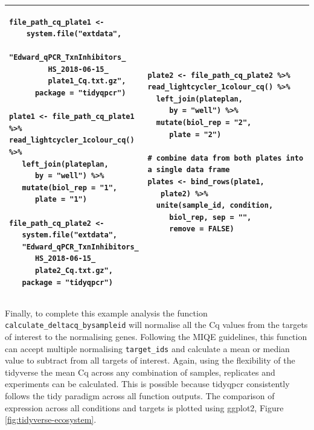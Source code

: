 \documentclass{SBCbookchapter}
\begin{document}
\begin{center}
\begin{tabular}{|p{5.6cm}  p{5.6cm}|}
\hline
 \begin{lstlisting}[firstnumber=40]
 file_path_cq_plate1 <- 
    system.file("extdata",
      "Edward_qPCR_TxnInhibitors_
         HS_2018-06-15_
         plate1_Cq.txt.gz",
      package = "tidyqpcr")

plate1 <- file_path_cq_plate1 %>%
read_lightcycler_1colour_cq() %>%
   left_join(plateplan,
      by = "well") %>%
   mutate(biol_rep = "1",
      plate = "1")

file_path_cq_plate2 <-
   system.file("extdata",
   "Edward_qPCR_TxnInhibitors_
      HS_2018-06-15_
      plate2_Cq.txt.gz",
   package = "tidyqpcr")
\end{lstlisting} &
\begin{lstlisting}[firstnumber=60]
plate2 <- file_path_cq_plate2 %>%
read_lightcycler_1colour_cq() %>%
  left_join(plateplan,
     by = "well") %>%
  mutate(biol_rep = "2",
     plate = "2")

# combine data from both plates into a single data frame
plates <- bind_rows(plate1,
   plate2) %>%
  unite(sample_id, condition,
     biol_rep, sep = "",
     remove = FALSE)
\end{lstlisting} \\
\hline
\end{tabular}
\end{center}

Finally, to complete this example analysis the function \lstinline{calculate_deltacq_bysampleid} will normalise all the Cq values from the targets of interest to the normalising genes. Following the MIQE guidelines,  this function can accept multiple normalising \lstinline{target_ids} and calculate a mean or median value to subtract from all targets of interest. Again, using the flexibility of the tidyverse the mean Cq across any combination of samples, replicates and experiments can be calculated. This is possible because tidyqpcr consistently follows the tidy paradigm across all function outputs. The comparison of expression across all conditions and targets is plotted using ggplot2, Figure \ref{fig:tidyverse-ecosystem}.
\end{document}

